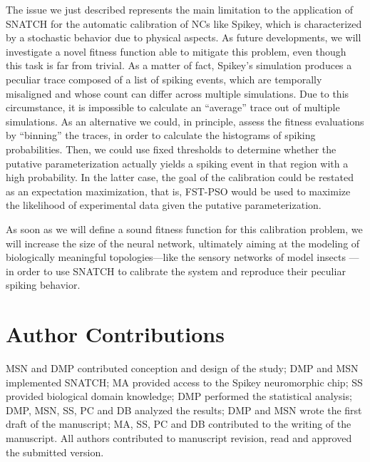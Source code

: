 \documentclass[utf8]{frontiersFPHY} %
\newcommand {\name}{SNATCH}
\begin{document}
The issue we just described represents the main limitation to the application of \name{} for the automatic calibration of NCs like Spikey, which is characterized by a stochastic behavior due to physical aspects. 
As future developments, we will investigate a novel fitness function able to mitigate this problem, even though this task is far from trivial.
As a matter of fact, Spikey's simulation produces a peculiar trace composed of a list of spiking events, which are temporally misaligned and whose count
can differ across multiple simulations. 
Due to this circumstance, it is impossible to calculate an ``average'' trace out of multiple simulations.
As an alternative we could, in principle, assess the fitness evaluations by ``binning'' the traces, in order to calculate the histograms of spiking probabilities.
Then, we could use fixed thresholds to determine whether the putative parameterization actually yields a spiking event in that region with a high probability. 
In the latter case, the goal of the calibration could be restated as an expectation maximization, that is, FST-PSO
would be used to maximize the likelihood of experimental data given the putative parameterization.

As soon as we will define a sound fitness function for this calibration problem, we will increase the size of the neural network,
ultimately aiming at the modeling of biologically meaningful topologies---like the sensory networks of model insects  \cite{namiki2009reconstruction,Pfeil2013}---in order to use \name{} to calibrate the system and reproduce their peculiar spiking behavior.

\section*{Author Contributions}
MSN and DMP contributed conception and design of the study; DMP and MSN implemented SNATCH; MA provided access to the Spikey neuromorphic chip; SS provided biological domain knowledge; DMP performed the statistical analysis; DMP, MSN, SS, PC and DB analyzed the results; DMP and MSN wrote the first draft of the manuscript; MA, SS, PC and DB contributed to the writing of the manuscript. All authors contributed to manuscript revision, read and approved the submitted version.
\end{document}
